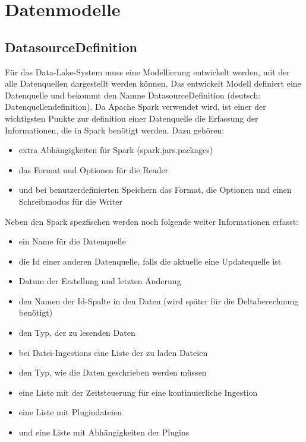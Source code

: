 \section{Datenmodelle}

\subsection{DatasourceDefinition}

Für das Data-Lake-System muss eine Modellierung entwickelt werden, mit der alle Datenquellen dargestellt werden können.
Das entwickelt Modell definiert eine Datenquelle und bekommt den Namne DatasourceDefinition (deutsch: Datenquellendefinition).
Da Apache Spark verwendet wird, ist einer der wichtigsten Punkte zur definition einer Datenquelle die Erfassung der Informationen, die in Spark benötigt werden.
Dazu gehören: \begin{itemize}
    \item extra Abhängigkeiten für Spark (spark.jars.packages)
    \item das Format und Optionen für die Reader
    \item und bei benutzerdefinierten Speichern das Format, die Optionen und einen Schreibmodus für die Writer
\end{itemize}
Neben den Spark spezfischen werden noch folgende weiter Informationen erfasst: \begin{itemize}
    \item ein Name für die Datenquelle
    \item die Id einer anderen Datenquelle, falls die aktuelle eine Updatequelle ist
    \item Datum der Erstellung und letzten Änderung
    \item den Namen der Id-Spalte in den Daten (wird später für die Deltaberechnung benötigt)
    \item den Typ, der zu lesenden Daten
    \item bei Datei-Ingestions eine Liste der zu laden Dateien
    \item den Typ, wie die Daten geschrieben werden müssen
    \item eine Liste mit der Zeitsteuerung für eine kontinuierliche Ingestion
    \item eine Liste mit Plugindateien
    \item und eine Liste mit Abhängigkeiten der Plugins
\end{itemize}

